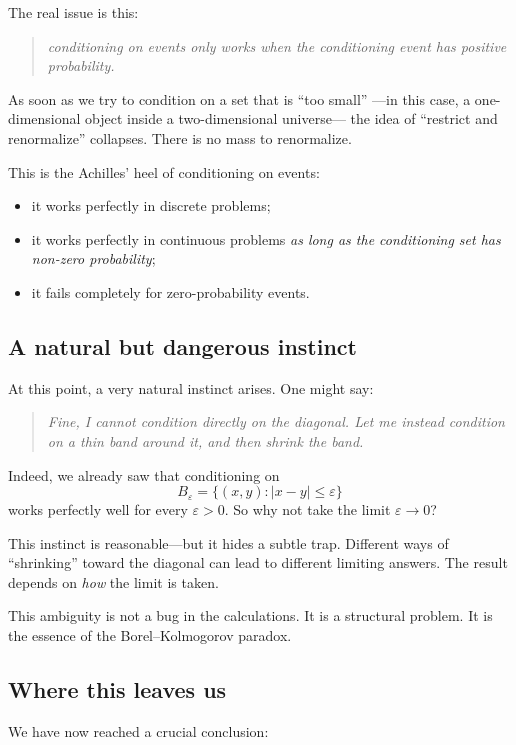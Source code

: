 \documentclass[11pt]{article}
\theoremstyle{remark}
\begin{document}
The real issue is this:
\begin{quote}
\emph{conditioning on events only works when the conditioning event has
positive probability.}
\end{quote}

As soon as we try to condition on a set that is ``too small''
—in this case, a one-dimensional object inside a two-dimensional universe—
the idea of ``restrict and renormalize'' collapses.
There is no mass to renormalize.

This is the Achilles' heel of conditioning on events:
\begin{itemize}
\item it works perfectly in discrete problems;
\item it works perfectly in continuous problems \emph{as long as the conditioning
      set has non-zero probability};
\item it fails completely for zero-probability events.
\end{itemize}

\subsection{A natural but dangerous instinct}

At this point, a very natural instinct arises.
One might say:
\begin{quote}
\emph{Fine, I cannot condition directly on the diagonal.
Let me instead condition on a thin band around it, and then shrink the band.}
\end{quote}

Indeed, we already saw that conditioning on
\[
B_\varepsilon=\{(x,y):|x-y|\le\varepsilon\}
\]
works perfectly well for every \(\varepsilon>0\).
So why not take the limit \(\varepsilon\to 0\)?

This instinct is reasonable—but it hides a subtle trap.
Different ways of ``shrinking'' toward the diagonal
can lead to different limiting answers.
The result depends on \emph{how} the limit is taken.

This ambiguity is not a bug in the calculations.
It is a structural problem.
It is the essence of the Borel--Kolmogorov paradox.

\subsection{Where this leaves us}

We have now reached a crucial conclusion:
\end{document}
